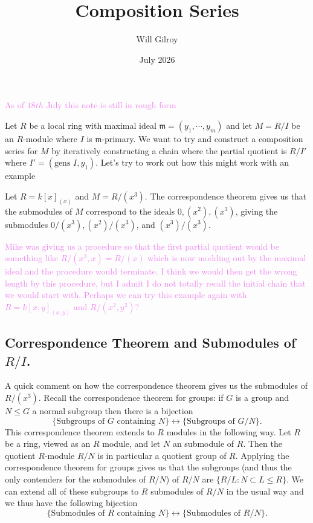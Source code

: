 \documentclass{article}
\title{
    Composition Series
}
\author{Will Gilroy}
\date{July 2026}
\theoremstyle{definition}
\theoremstyle{remark}
\newcommand{\wg}[1]{\textcolor{violet}{#1}}
\begin{document}
\maketitle
\wg{As of $18th$ July this note is still in rough form}

Let $R$ be a local ring with maximal ideal $\mathfrak m = (y_1, \cdots, y_m)$ and let $M =
R/I$ be an $R$-module where $I$ is $\mathfrak m$-primary. We want to try and
construct a composition series for $M$ by iteratively constructing a chain where the partial
quotient is $R/I'$ where $I' = (\text{gens } I, y_1)$. Let's try to work out how
this might work with an example

Let $R = k[x]_{(x)}$ and $M = R/(x^3)$. 
The correspondence theorem gives us that the submodules of $M$ correspond to the
ideals $0, (x^2), (x^3)$, giving the submodules $0/(x^3), (x^2)/(x^3)$, and
$(x^3)/(x^3)$. 

\wg{Mike was giving us a procedure so that the first partial quotient would 
be something like $R/(x^3, x) = R/(x)$ which is now modding out by the maximal 
ideal and the procedure would terminate. I think we would then get the wrong
length by this procedure, but I admit I do not totally recall the 
initial chain that we would start with.}
\wg{Perhaps we can try this example again with $R = k[x,y]_{(x,y)}$ and $R/(x^2,
y^2)$?}

\appendix
\subsection{Correspondence Theorem and Submodules of $R/I$.}
A quick comment on how the correspondence theorem gives us the 
submodules of $R/(x^3)$. Recall the correspondence theorem for groups:
if $G$ is a group and $N \leq G$ a normal subgroup then there is a bijection
\[
    \{ \text{Subgroups of $G$ containing $N$} \} \leftrightarrow
    \{ \text{Subgroups of $G/N$}\}.
\]
This correspondence theorem extends to $R$ modules in the following way.
Let $R$ be a ring, viewed as an $R$ module, and let $N$ an submodule of $R$. 
Then the quotient $R$-module $R/N$ is in particular a quotient group of $R$.
Applying the correspondence theorem for groups gives us that the subgroups (and
thus the only contenders for the submodules of $R/N$)
of $R/N$ are $\{R/L : N \subset L \leq R \}$. We can extend all of these
subgroups to $R$ submodules of $R/N$ in the usual way and we thus have the
following bijection
\[
    \{\text{Submodules of $R$ containing $N$}\} \leftrightarrow
    \{\text{Submodules of $R/N$}\}. 
\]
\end{document}
